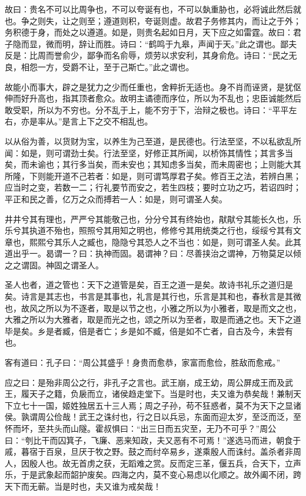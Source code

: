 \documentclass[]{article}
\begin{document}
故曰：贵名不可以比周争也，不可以夸诞有也，不可以埶重胁也，必将诚此然后就也。争之则失，让之则至；遵道则积，夸诞则虚。故君子务修其内，而让之于外；务积德于身，而处之以遵道。如是，则贵名起如日月，天下应之如雷霆。故曰：君子隐而显，微而明，辞让而胜。诗曰：``鹤鸣于九皋，声闻于天。''此之谓也。鄙夫反是：比周而誉俞少，鄙争而名俞辱，烦劳以求安利，其身俞危。诗曰：``民之无良，相怨一方，受爵不让，至于己斯亡。''此之谓也。

故能小而事大，辟之是犹力之少而任重也，舍粹折无适也。身不肖而诬贤，是犹伛伸而好升高也，指其顶者愈众。故明主谲德而序位，所以为不乱也；忠臣诚能然后敢受职，所以为不穷也。分不乱于上，能不穷于下，治辩之极也。诗曰：``平平左右，亦是率从。''是言上下之交不相乱也。

以从俗为善，以货财为宝，以养生为己至道，是民德也。行法至坚，不以私欲乱所闻：如是，则可谓劲士矣。行法至坚，好修正其所闻，以桥饰其情性；其言多当矣，而未谕也；其行多当矣，而未安也；其知虑多当矣，而未周密也；上则能大其所隆，下则能开道不己若者：如是，则可谓笃厚君子矣。修百王之法，若辨白黑；应当时之变，若数一二；行礼要节而安之，若生四枝；要时立功之巧，若诏四时；平正和民之善，亿万之众而搏若一人：如是，则可谓圣人矣。

井井兮其有理也，严严兮其能敬己也，分分兮其有终始也，猒猒兮其能长久也，乐乐兮其执道不殆也，照照兮其用知之明也，修修兮其用统类之行也，绥绥兮其有文章也，熙熙兮其乐人之臧也，隐隐兮其恐人之不当也：如是，则可谓圣人矣。此其道出乎一。曷谓一？曰：执神而固。曷谓神？曰：尽善挟治之谓神，万物莫足以倾之之谓固。神固之谓圣人。

圣人也者，道之管也：天下之道管是矣，百王之道一是矣。故诗书礼乐之道归是矣。诗言是其志也，书言是其事也，礼言是其行也，乐言是其和也，春秋言是其微也，故风之所以为不逐者，取是以节之也，小雅之所以为小雅者，取是而文之也，大雅之所以为大雅者，取是而光之也，颂之所以为至者，取是而通之也。天下之道毕是矣。乡是者臧，倍是者亡；乡是如不臧，倍是如不亡者，自古及今，未尝有也。

客有道曰：孔子曰：``周公其盛乎！身贵而愈恭，家富而愈俭，胜敌而愈戒。''

应之曰：是殆非周公之行，非孔子之言也。武王崩，成王幼，周公屏成王而及武王，履天子之籍，负扆而立，诸侯趋走堂下。当是时也，夫又谁为恭矣哉！兼制天下立七十一国，姬姓独居五十三人焉；周之子孙，苟不狂惑者，莫不为天下之显诸侯。孰谓周公俭哉！武王之诛纣也，行之日以兵忌，东面而迎太岁，至泛而泛，至怀而坏，至共头而山隧。霍叔惧曰：``出三日而五灾至，无乃不可乎？''周公曰：``刳比干而囚箕子，飞廉、恶来知政，夫又恶有不可焉！''遂选马而进，朝食于戚，暮宿于百泉，旦厌于牧之野。鼓之而纣卒易乡，遂乘殷人而诛纣。盖杀者非周人，因殷人也。故无首虏之获，无蹈难之赏。反而定三革，偃五兵，合天下，立声乐，于是武象起而韶护废矣。四海之内，莫不变心易虑以化顺之。故外阖不闭，跨天下而无蕲。当是时也，夫又谁为戒矣哉！
\end{document}
